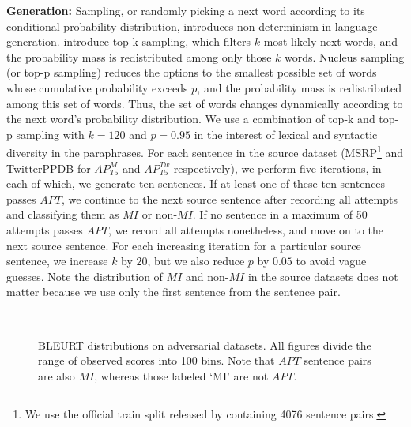 \noindent \textbf{Generation:} Sampling, or randomly picking a next word according to its conditional probability distribution, introduces non-determinism in language generation. \citet{fan2018hierarchical} introduce top-k sampling, which filters $k$ most likely next words, and the probability mass is redistributed among only those $k$ words. Nucleus sampling (or top-p sampling) \cite{holtzman2020curious} reduces the options to the smallest possible set of words whose cumulative probability exceeds $p$, and the probability mass is redistributed among this set of words. Thus, the set of words changes dynamically according to the next word's probability distribution. We use a combination of top-k and top-p sampling with $k=120$ and $p=0.95$ in the interest of lexical and syntactic diversity in the paraphrases. For each sentence in the source dataset (MSRP\footnote{We use the official train split released by \citet{dolan2005automatically} containing 4076 sentence pairs.} and TwitterPPDB for $AP^M_{T5}$ and $AP^{Tw}_{T5}$ respectively), we perform five iterations, in each of which, we generate ten sentences. If at least one of these ten sentences passes $APT$, we continue to the next source sentence after recording all attempts and classifying them as $MI$ or non-$MI$. If no sentence in a maximum of 50 attempts passes $APT$, we record all attempts nonetheless, and move on to the next source sentence. For each increasing iteration for a particular source sentence, we increase $k$ by $20$, but we also reduce $p$ by $0.05$ to avoid vague guesses. Note the distribution of $MI$ and non-$MI$ in the source datasets does not matter because we use only the first sentence from the sentence pair.

\begin{figure*}[t]
    \centering
    \\
    \caption{BLEURT distributions on adversarial datasets. All figures divide the range of observed scores into 100 bins. Note that $APT$ sentence pairs are also $MI$, whereas those labeled `MI' are not $APT$.}
    \label{fig:bleurt}
\end{figure*}


